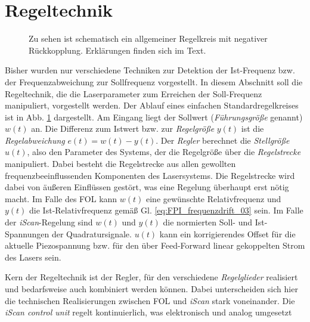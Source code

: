 \section{Regeltechnik}\label{sec:regeltechnik}
\begin{figure}[h]
 	\centering
	\caption[Regelkreis]{Zu sehen ist schematisch ein allgemeiner Regelkreis mit
	negativer Rückkopplung. Erklärungen finden sich im
	Text.}\label{fig:regelkreis}
\end{figure}
Bisher wurden nur verschiedene Techniken zur Detektion der
Ist-Frequenz bzw. der Frequenzabweichung zur Sollfrequenz vorgestellt.
In diesem Abschnitt soll die Regeltechnik, die die Laserparameter zum Erreichen
der Soll-Frequenz manipuliert, vorgestellt werden. Der Ablauf eines
einfachen Standardregelkreises ist in Abb. \ref{fig:regelkreis} dargestellt. Am
Eingang liegt der Sollwert (\textit{Führungsgröße} genannt) $w(t)$ an. Die
Differenz zum Istwert bzw. zur \textit{Regelgröße} $y(t)$ ist die
\textit{Regelabweichung} $e(t)=w(t)-y(t)$. Der \textit{Regler} berechnet die
\textit{Stellgröße} $u(t)$, also den Parameter des Systems, der die Regelgröße
über die \textit{Regelstrecke} manipuliert. Dabei besteht die Regelstrecke aus
allen gewollten frequenzbeeinflussenden Komponenten des Lasersystems. Die
Regelstrecke wird dabei von äußeren Einflüssen gestört, was eine Regelung
überhaupt erst nötig macht. Im Falle des FOL kann $w(t)$ eine
gewünschte Relativfrequenz und $y(t)$ die Ist-Relativfrequenz gemäß Gl.
\eqref{eq:FPI_frequenzdrift_03} sein. Im Falle der \textit{iScan}-Regelung sind
$w(t)$ und $y(t)$ die normierten Soll- und Ist-Spannungen der Quadratursignale. $u(t)$
kann ein korrigierendes Offset für die aktuelle Piezospannung bzw. für den über
Feed-Forward linear gekoppelten Strom des Lasers sein.\par
Kern der Regeltechnik ist der Regler, für den verschiedene \textit{Regelglieder}
realisiert und bedarfsweise auch kombiniert werden können.
Dabei unterscheiden sich hier die technischen Realisierungen zwischen
FOL und \textit{iScan} stark voneinander. Die \textit{iScan
control unit} regelt kontinuierlich, was elektronisch und analog umgesetzt
